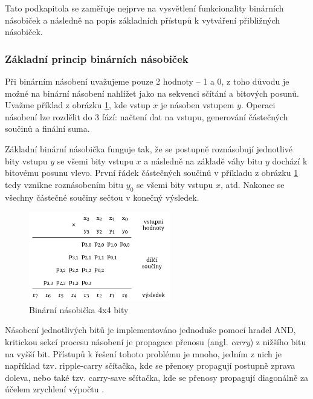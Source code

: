 Tato podkapitola se zaměřuje nejprve na vysvětlení funkcionality binárních násobiček a následně na popis základních přístupů k vytváření přibližných násobiček.

\subsubsection{Základní princip binárních násobiček}
Při binárním násobení uvažujeme pouze 2 hodnoty -- 1 a 0, z toho důvodu je možné na binární násobení nahlížet jako na sekvenci sčítání a bitových posunů. Uvažme příklad z obrázku \ref{fig:binmult}, kde vstup $x$ je násoben vstupem $y$. Operaci násobení lze rozdělit do 3 fází: načtení dat na vstupu, generování částečných součinů a finální suma.

Základní binární násobička funguje tak, že se postupně roznásobují jednotlivé bity vstupu $y$ se všemi bity vstupu $x$ a následně na základě váhy bitu $y$ dochází k bitovému posunu vlevo. První řádek částečných součinů v příkladu z obrázku \ref{fig:binmult} tedy vznikne roznásobením bitu $y_0$ se všemi bity vstupu $x$, atd. Nakonec se všechny částečné součiny sečtou v konečný výsledek.

\begin{figure}[H]
    \centering
    \includegraphics[width=0.55\textwidth]{obrazky-figures/binmult.png}
    \caption{Binární násobička 4x4 bity}
    \label{fig:binmult}
\end{figure}

Násobení jednotlivých bitů je implementováno jednoduše pomocí hradel AND, kritickou sekcí procesu násobení je propagace přenosu (angl. \textit{carry}) z nižšího bitu na vyšší bit. Přístupů k řešení tohoto problému je mnoho, jedním z nich je například tzv. ripple-carry sčítačka, kde se přenosy propagují postupně zprava doleva, nebo také tzv. carry-save sčítačka, kde se přenosy propagují diagonálně za účelem zrychlení výpočtu \cite{approx_mult_survey}.

